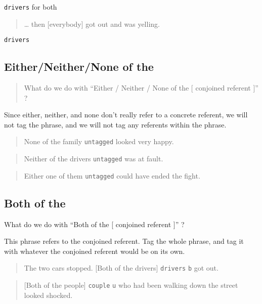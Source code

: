 \documentclass[
]{book}
\begin{document}
\texttt{drivers} for both

\begin{quote}
\ldots{} then {[}everybody{]} got out and was yelling.
\end{quote}

\texttt{drivers}

\hypertarget{eitherneithernone-of-the}{%
\subsection{Either/Neither/None of the}\label{eitherneithernone-of-the}}

\begin{quote}
What do we do with ``Either / Neither / None of the {[} conjoined referent {]}'' ?
\end{quote}

Since either, neither, and none don't really refer to a concrete referent, we will not tag the phrase,
and we will not tag any referents within the phrase.

\begin{quote}
None of the family \texttt{untagged} looked very happy.
\end{quote}

\begin{quote}
Neither of the drivers \texttt{untagged} was at fault.
\end{quote}

\begin{quote}
Either one of them \texttt{untagged} could have ended the fight.
\end{quote}

\hypertarget{both-of-the}{%
\subsection{Both of the}\label{both-of-the}}

What do we do with ``Both of the {[} conjoined referent {]}'' ?

This phrase refers to the conjoined referent. Tag the whole phrase, and tag it with whatever the conjoined referent would be on its own.

\begin{quote}
The two cars stopped.
{[}Both of the drivers{]} \texttt{drivers} \texttt{b} got out.
\end{quote}

\begin{quote}
{[}Both of the people{]} \texttt{couple} \texttt{u} who had been walking down the street looked shocked.
\end{quote}
\end{document}
